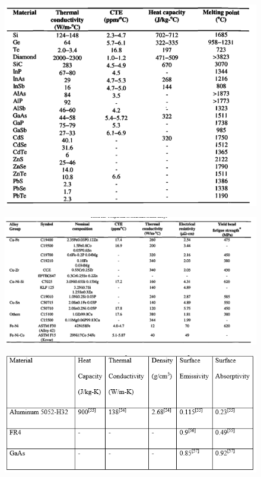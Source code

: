 \documentclass[final]{cubedoc}
\begin{document}
\begin{figure}[h!]
    \centering
    \includegraphics[keepaspectratio, width=\textwidth]{docs/material_overall_properties.png}
    \caption{\cite[p.25]{pecht1998electronic}}
    \label{fig:my_label}
\end{figure}

\begin{figure}[h!]
    \centering
    \includegraphics[keepaspectratio, width=\textwidth]{docs/copper_alloys_blackwell.png}
    \caption{\cite[p.55]{pecht1998electronic}}
    \label{fig:copper_alloys}
\end{figure}

\begin{figure}[h!]
    \centering
    \includegraphics[keepaspectratio, width=\textwidth]{docs/fr4_emiss.png}
    \caption{\cite[p.93]{rathbun2017design}}
    \label{fig:fr4emiss}
\end{figure}
\end{document}
